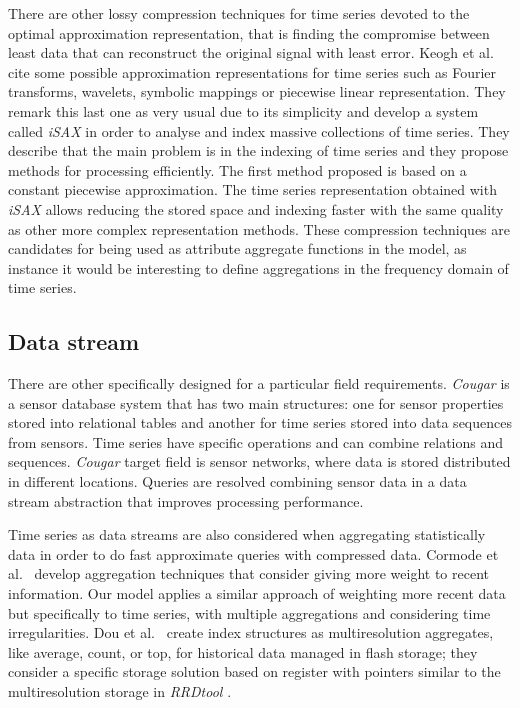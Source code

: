 There are other lossy compression techniques for time series devoted
to the optimal approximation representation, that is finding the
compromise between least data that can reconstruct the original signal
with least error. Keogh et al.\ \cite{keogh01} cite some possible
approximation representations for time series such as Fourier
transforms, wavelets, symbolic mappings or piecewise linear
representation. They remark this last one as very usual due to its
simplicity and develop a system called \emph{iSAX}
\cite{keogh08:isax,keogh10:isax} in order to analyse and index massive
collections of time series. They describe that the main problem is in
the indexing of time series and they propose methods for processing
efficiently. The first method proposed is based on a constant
piecewise approximation. The time series representation obtained with
\emph{iSAX} allows reducing the stored space and indexing faster with
the same quality as other more complex representation methods.  These
compression techniques are candidates for being used as attribute
aggregate functions in the  model, as instance it would be
interesting to define aggregations in the frequency domain of time
series.


 


\subsection{Data stream}



There are other  specifically designed for a particular
field requirements.  \emph{Cougar} \cite{bonnet01} is a sensor
database system that has two main structures: one for sensor
properties stored into relational tables and another for time series
stored into data sequences from sensors. Time series have specific
operations and can combine relations and sequences. \emph{Cougar}
target field is sensor networks, where data is stored distributed in
different locations. Queries are resolved combining sensor data in a
data stream abstraction that improves processing performance.

Time series as data streams are also considered when aggregating
statistically data in order to do fast approximate queries with
compressed data. Cormode et al.\ \cite{cormode08:pods} develop
aggregation techniques that consider giving more weight to recent
information.  Our  model applies a similar approach of
weighting more recent data but specifically to time series, with
multiple aggregations and considering time irregularities.  Dou et
al.\ \cite{dou14:historic_queries_flash_storage} create index
structures as multiresolution aggregates, like average, count, or top,
for historical data managed in flash storage; they consider a specific
storage solution based on register with pointers similar to the
multiresolution storage in \emph{RRDtool} \cite{lisa98:oetiker}.







